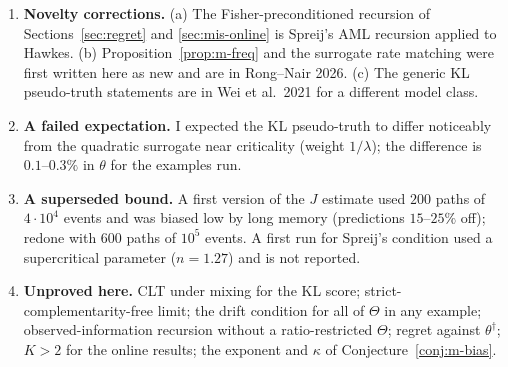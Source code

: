 \begin{enumerate}[nosep]
\item \textbf{Novelty corrections.} (a) The Fisher-preconditioned recursion of Sections~\ref{sec:regret} and \ref{sec:mis-online} is Spreij's AML recursion applied to Hawkes. (b) Proposition~\ref{prop:m-freq} and the surrogate rate matching were first written here as new and are in Rong--Nair 2026. (c) The generic KL pseudo-truth statements are in Wei et al.\ 2021 for a different model class.
\item \textbf{A failed expectation.} I expected the KL pseudo-truth to differ noticeably from the quadratic surrogate near criticality (weight $1/\lambda$); the difference is $0.1$--$0.3\%$ in $\theta$ for the examples run.
\item \textbf{A superseded bound.} A first version of the $J$ estimate used $200$ paths of $4\cdot10^4$ events and was biased low by long memory (predictions $15$--$25\%$ off); redone with $600$ paths of $10^5$ events. A first run for Spreij's condition used a supercritical parameter ($n=1.27$) and is not reported.
\item \textbf{Unproved here.} CLT under mixing for the KL score; strict-complementarity-free limit; the drift condition for all of $\Theta$ in any example; observed-information recursion without a ratio-restricted $\Theta$; regret against $\theta^\dagger$; $K>2$ for the online results; the exponent and $\kappa$ of Conjecture~\ref{conj:m-bias}.
\end{enumerate}
